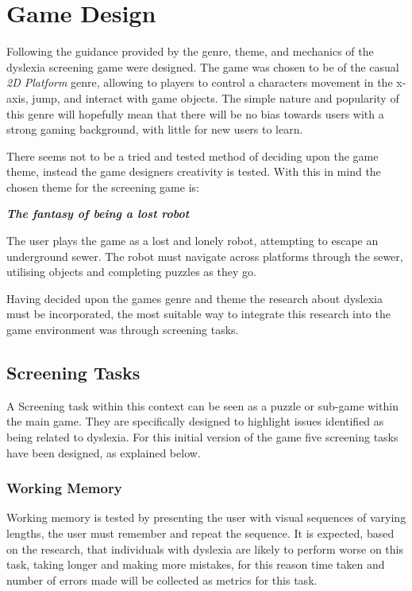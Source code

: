 \documentclass[journal]{IEEEtran}
\begin{document}
\section{Game Design}
\label{sec:gamedesign}

Following the guidance provided by \cite{artOfGameDesign} the genre, theme, and mechanics of the dyslexia screening game were designed. The game was chosen to be of the casual \emph{2D Platform} genre, allowing to players to control a characters movement in the x-axis, jump, and interact with game objects. The simple nature and popularity of this genre will hopefully mean that there will be no bias towards users with a strong gaming background, with little for new users to learn. 

There seems not to be a tried and tested method of deciding upon the game theme, instead the game designers creativity is tested. With this in mind the chosen theme for the screening game is:
\begin{center}
\textit{\textbf{The fantasy of being a lost robot}}
\end{center}
The user plays the game as a lost and lonely robot, attempting to escape an underground sewer. The robot must navigate across platforms  through the sewer, utilising objects and completing puzzles as they go.

Having decided upon the games genre and theme the research about dyslexia must be incorporated, the most suitable way to integrate this research into the game environment was through screening tasks. 

\subsection{Screening Tasks}
\label{sec:screening_Tasks}
A Screening task within this context can be seen as a puzzle or sub-game within the main game. They are specifically designed to highlight issues identified as being related to dyslexia. 
For this initial version of the game five screening tasks have been designed, as explained below.

\subsubsection{Working Memory} 
Working memory is tested by presenting the user with visual sequences of varying lengths, the user must remember and repeat the sequence. It is expected, based on the research, that individuals with dyslexia are likely to perform worse on this task, taking longer and making more mistakes, for this reason time taken and number of errors made will be collected as metrics for this task.
\end{document}
